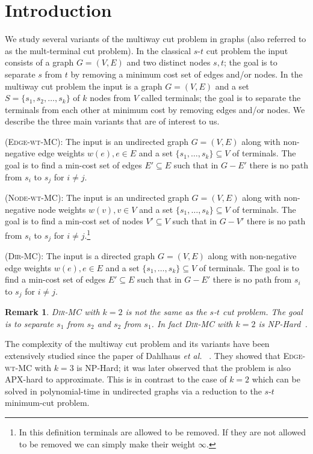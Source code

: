 \documentclass[11pt]{article}
\newtheorem{remark}[lemma]{Remark}
\newcommand{\etal}{{\em et al.}~}
\def\MC{\textsc{Edge-wt-MC}\xspace}
\def\DirMC{\textsc{Dir-MC}\xspace}
\def\NodeMC{\textsc{Node-wt-MC}\xspace}
\def\NodeMC{\textsc{Node-wt-MC}\xspace}
\begin{document}
\newpage
\section{Introduction}
We study several variants of the multiway cut problem in graphs (also
referred to as the mult-terminal cut problem). In the classical
$s$-$t$ cut problem the input consists of a graph $G=(V,E)$ and two
distinct nodes $s,t$; the goal is to separate $s$ from $t$ by removing
a minimum cost set of edges and/or nodes. In the multiway cut problem
the input is a graph $G=(V,E)$ and a set $S = \{s_1,s_2,\ldots,s_k\}$
of $k$ nodes from $V$ called terminals; the goal is to separate the terminals
from each other at minimum cost by removing edges and/or nodes. We
describe the three main variants that are of interest to us.

\medskip 
{} (\MC): The input is an undirected
graph $G=(V,E)$ along with non-negative edge weights $w(e), e \in E$
and a set $\{s_1,\ldots,s_k\} \subseteq V$ of terminals. The goal
is to find a min-cost set of edges $E' \subseteq E$ such that in $G
- E'$ there is no path from $s_i$ to $s_j$ for $i \neq j$.

\medskip 
{} (\NodeMC): The input is an
undirected graph $G=(V,E)$ along with non-negative node weights $w(v),
v \in V$ and a set $\{s_1,\ldots,s_k\} \subseteq V$ of terminals. The
goal is to find a min-cost set of nodes $V' \subseteq V$ such that
in $G - V'$ there is no path from $s_i$ to $s_j$ for $i \neq j$.\footnote{
In this definition terminals are allowed to be removed. If they are not allowed
to be removed we can simply make their weight $\infty$.}



\medskip 
{} (\DirMC): The input is a
directed graph $G=(V,E)$ along with non-negative edge weights $w(e),
e \in E$ and a set $\{s_1,\ldots,s_k\} \subseteq V$ of terminals. The
goal is to find a min-cost set of edges $E' \subseteq E$ such that
in $G - E'$ there is no path from $s_i$ to $s_j$ for $i \neq j$.

\begin{remark}
  \DirMC with $k=2$ is \emph{not} the same as the $s$-$t$ cut problem.
  The goal is to separate $s_1$ from $s_2$ \emph{and} $s_2$ from $s_1$.
  In fact \DirMC with $k=2$ is NP-Hard~\cite{GargVY94}. 
\end{remark}

The complexity of the multiway cut problem and its variants have been
extensively studied since the paper of Dahlhaus \etal
\cite{DahlhausJPSY92}. They showed that \MC with $k=3$ is NP-Hard; it
was later observed that the problem is also APX-hard to approximate. This
is in contrast to the case of $k=2$ which can be solved in 
polynomial-time in undirected graphs via a reduction to the
$s$-$t$ minimum-cut problem.
\end{document}
